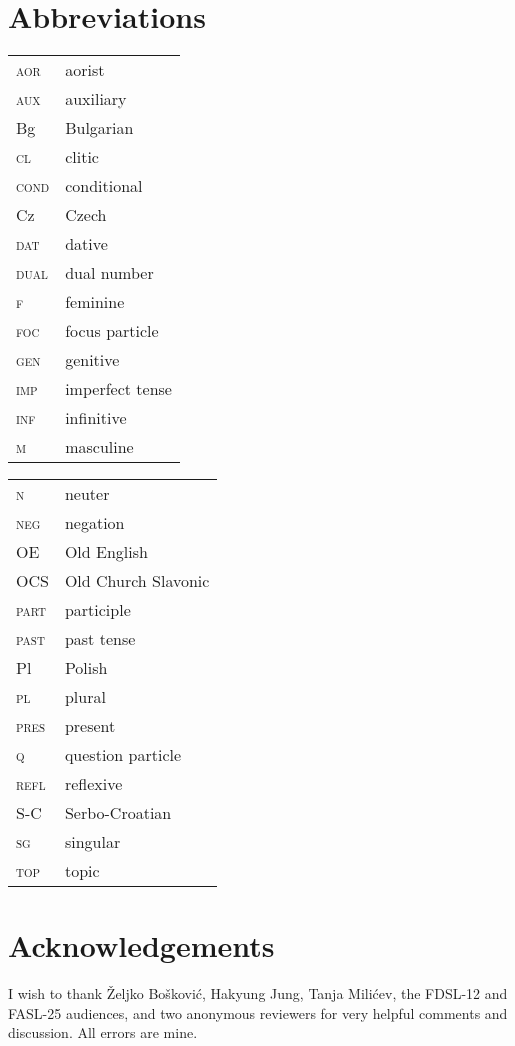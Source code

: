 \documentclass[output=paper,modfonts,newtxmath,hidelinks]{langscibook}
\begin{document}
\section*{Abbreviations}

\begin{tabularx}{.5\textwidth}{@{}lQ@{}}
\textsc{aor}&aorist\\
\textsc{aux}&auxiliary\\
Bg&Bulgarian\\
\textsc{cl}&clitic\\
\textsc{cond}&conditional\\
Cz&Czech\\
\textsc{dat}&dative\\ 
\textsc{dual}&dual number\\
\textsc{f}&feminine\\
\textsc{foc}&focus particle\\
\textsc{gen}&genitive\\
\textsc{imp}&imperfect tense\\
\textsc{inf}&infinitive\\
\textsc{m}&masculine\\
\end{tabularx}%
\begin{tabularx}{.5\textwidth}{@{}lQ@{}}
\textsc{n}&neuter\\
\textsc{neg}&negation\\
OE&Old English\\
OCS&Old Church Slavonic\\
\textsc{part}&participle\\
\textsc{past}&past tense\\
Pl&Polish\\
\textsc{pl}&plural\\
\textsc{pres}&present\\
\textsc{q}&question particle\\
\textsc{refl}&reflexive\\
S-C&Serbo-Croatian\\
\textsc{sg}&singular\\
\textsc{top}&topic\\
\end{tabularx}

\section*{Acknowledgements}

I wish to thank Željko Bošković, Hakyung Jung, Tanja Milićev, the FDSL-12 and FASL-25 audiences, and two anonymous reviewers for very helpful comments and discussion. All errors are mine.

\sloppy
\printbibliography[heading=subbibliography,notkeyword=this]
\end{document}
